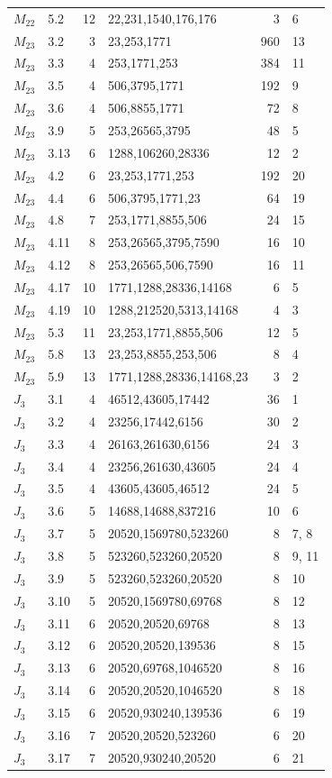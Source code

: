 \begin{longtable}{@{}llrlrl@{}}
$M_{22}$ & 5.2 & 12 & 22,231,1540,176,176 & 3 & 6 \\
$M_{23}$ & 3.2 & 3 & 23,253,1771 & 960 & 13 \\
$M_{23}$ & 3.3 & 4 & 253,1771,253 & 384 & 11 \\
$M_{23}$ & 3.5 & 4 & 506,3795,1771 & 192 & 9 \\
$M_{23}$ & 3.6 & 4 & 506,8855,1771 & 72 & 8 \\
$M_{23}$ & 3.9 & 5 & 253,26565,3795 & 48 & 5 \\
$M_{23}$ & 3.13 & 6 & 1288,106260,28336 & 12 & 2 \\
$M_{23}$ & 4.2 & 6 & 23,253,1771,253 & 192 & 20 \\
$M_{23}$ & 4.4 & 6 & 506,3795,1771,23 & 64 & 19 \\
$M_{23}$ & 4.8 & 7 & 253,1771,8855,506 & 24 & 15 \\
$M_{23}$ & 4.11 & 8 & 253,26565,3795,7590 & 16 & 10 \\
$M_{23}$ & 4.12 & 8 & 253,26565,506,7590 & 16 & 11 \\
$M_{23}$ & 4.17 & 10 & 1771,1288,28336,14168 & 6 & 5 \\
$M_{23}$ & 4.19 & 10 & 1288,212520,5313,14168 & 4 & 3 \\
$M_{23}$ & 5.3 & 11 & 23,253,1771,8855,506 & 12 & 5 \\
$M_{23}$ & 5.8 & 13 & 23,253,8855,253,506 & 8 & 4 \\
$M_{23}$ & 5.9 & 13 & 1771,1288,28336,14168,23 & 3 & 2 \\
$J_{3}$ & 3.1 & 4 & 46512,43605,17442 & 36 & 1 \\
$J_{3}$ & 3.2 & 4 & 23256,17442,6156 & 30 & 2 \\
$J_{3}$ & 3.3 & 4 & 26163,261630,6156 & 24 & 3 \\
$J_{3}$ & 3.4 & 4 & 23256,261630,43605 & 24 & 4 \\
$J_{3}$ & 3.5 & 4 & 43605,43605,46512 & 24 & 5 \\
$J_{3}$ & 3.6 & 5 & 14688,14688,837216 & 10 & 6 \\
$J_{3}$ & 3.7 & 5 & 20520,1569780,523260 & 8 & 7, 8 \\
$J_{3}$ & 3.8 & 5 & 523260,523260,20520 & 8 & 9, 11 \\
$J_{3}$ & 3.9 & 5 & 523260,523260,20520 & 8 & 10 \\
$J_{3}$ & 3.10 & 5 & 20520,1569780,69768 & 8 & 12 \\
$J_{3}$ & 3.11 & 6 & 20520,20520,69768 & 8 & 13 \\
$J_{3}$ & 3.12 & 6 & 20520,20520,139536 & 8 & 15 \\
$J_{3}$ & 3.13 & 6 & 20520,69768,1046520 & 8 & 16 \\
$J_{3}$ & 3.14 & 6 & 20520,20520,1046520 & 8 & 18 \\
$J_{3}$ & 3.15 & 6 & 20520,930240,139536 & 6 & 19 \\
$J_{3}$ & 3.16 & 7 & 20520,20520,523260 & 6 & 20 \\
$J_{3}$ & 3.17 & 7 & 20520,930240,20520 & 6 & 21 \\
\end{longtable}
